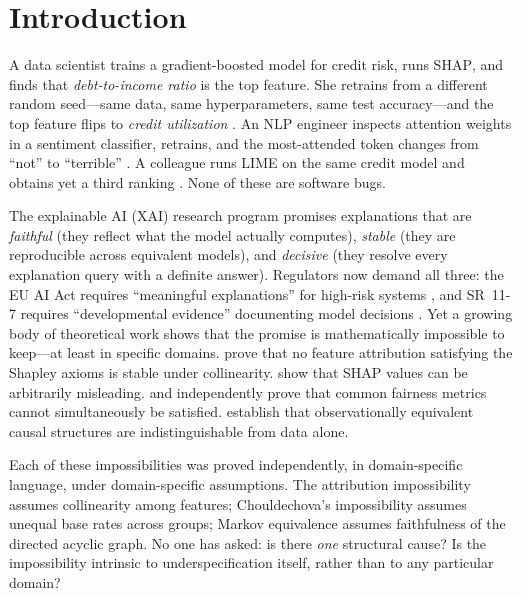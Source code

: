 \documentclass[11pt,a4paper]{article}
\newcommand{\SHAP}{\textsc{SHAP}}
\begin{document}
\section{Introduction}
\label{sec:intro}

A data scientist trains a gradient-boosted model for credit risk, runs \SHAP{},
and finds that \emph{debt-to-income ratio} is the top feature.  She retrains
from a different random seed---same data, same hyperparameters, same test
accuracy---and the top feature flips to \emph{credit utilization}
\citep{krishna2022disagreement}.  An NLP engineer inspects attention weights in
a sentiment classifier, retrains, and the most-attended token changes from
``not'' to ``terrible'' \citep{jainwallace2019}.  A colleague runs LIME on the
same credit model and obtains yet a third ranking
\citep{molnar2022general}.  None of these are software bugs.

The explainable AI (XAI) research program promises explanations that are
\emph{faithful} (they reflect what the model actually computes),
\emph{stable} (they are reproducible across equivalent models), and
\emph{decisive} (they resolve every explanation query with a definite answer).
Regulators now demand all three: the EU AI Act requires ``meaningful
explanations'' for high-risk systems \citep{euaiact2024}, and SR~11-7 requires
``developmental evidence'' documenting model decisions
\citep{occ2011sr117}.  Yet a growing body of theoretical work shows that the
promise is mathematically impossible to keep---at least in specific domains.
\citet{bilodeau2024impossibility} prove that no feature attribution satisfying
the Shapley axioms is stable under collinearity.
\citet{huang2024failings} show that SHAP values can be arbitrarily
misleading.  \citet{chouldechova2017fair} and \citet{kleinberg2017inherent}
independently prove that common fairness metrics cannot simultaneously be
satisfied.  \citet{verma1991equivalence} establish that observationally
equivalent causal structures are indistinguishable from data alone.

Each of these impossibilities was proved independently, in domain-specific
language, under domain-specific assumptions.  The attribution impossibility
assumes collinearity among features; Chouldechova's impossibility assumes
unequal base rates across groups; Markov equivalence assumes faithfulness of
the directed acyclic graph.  No one has asked: is there \emph{one} structural
cause?  Is the impossibility intrinsic to underspecification itself, rather
than to any particular domain?
\end{document}
